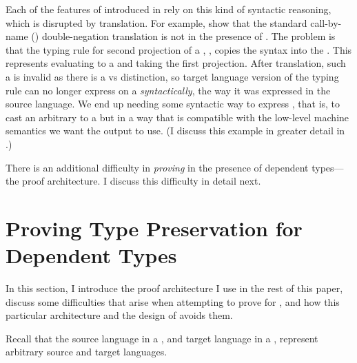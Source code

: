 Each of the features of  introduced in 
rely on this kind of syntactic reasoning, which is disrupted by translation.
For example, \citet{barthe2002} show that the standard call-by-name
() double-negation  translation is not  in the presence of .
The problem is that the typing rule  for second projection of a
, \im{\ssnde{\se} : \subst{\sB}{\sfste{\se}}{\sx}}, copies
the syntax \im{\sfste{\se}} into the  \im{\sB}.
This represents evaluating \im{\se} to a  and taking the first
projection.
After  translation, such a  is invalid as there is a
 vs  distinction, so target language version of
the typing rule  can no longer express  on
a 
\emph{syntactically}, the way it was expressed in the source language.
We end up needing some syntactic way to express , that is, to cast an
arbitrary  to a  but in a way that is compatible
with the low-level machine semantics we want the output to use.
(I discuss this example in greater detail in .)

There is an additional difficulty in \emph{proving}  in
the presence of dependent types---the proof architecture.
I discuss this difficulty in detail next.

\section{Proving Type Preservation for Dependent Types}
\label{sec:source:proof-arch}
In this section, I introduce the proof architecture I use in the rest of this
paper, discuss some difficulties that arise when attempting to prove  for , and how this particular architecture
and the design of \slang avoids them.

\begin{typographical}
  Recall that the source language in a \emph{}, and target language in a
  \emph{}, represent arbitrary source and
  target languages.
\end{typographical}

